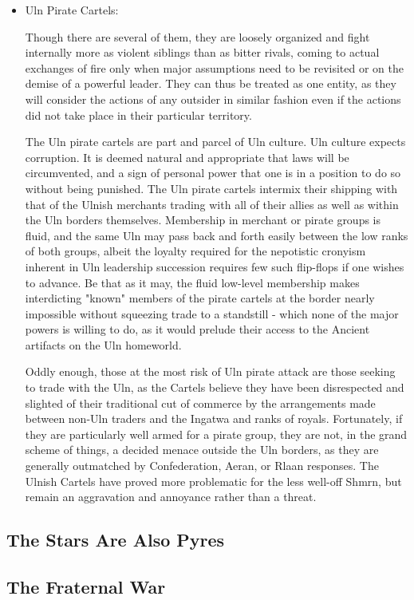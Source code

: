 \begin{itemize}
\item Uln Pirate Cartels:

Though there are several of them, they are loosely organized and fight
internally more as violent siblings than as bitter rivals, coming to
actual exchanges of fire only when major assumptions need to be
revisited or on the demise of a powerful leader. They can thus be
treated as one entity, as they will consider the actions of any
outsider in similar fashion even if the actions did not take place in
their particular territory.

The Uln pirate cartels are part and parcel of Uln culture. Uln culture
expects corruption. It is deemed natural and appropriate that laws
will be circumvented, and a sign of personal power that one is in a
position to do so without being punished. The Uln pirate cartels
intermix their shipping with that of the Ulnish merchants trading with
all of their allies as well as within the Uln borders
themselves. Membership in merchant or pirate groups is fluid, and the
same Uln may pass back and forth easily between the low ranks of both
groups, albeit the loyalty required for the nepotistic cronyism
inherent in Uln leadership succession requires few such flip-flops if
one wishes to advance. Be that as it may, the fluid low-level
membership makes interdicting "known" members of the pirate cartels at
the border nearly impossible without squeezing trade to a standstill -
which none of the major powers is willing to do, as it would prelude
their access to the Ancient artifacts on the Uln homeworld.

Oddly enough, those at the most risk of Uln pirate attack are those
seeking to trade with the Uln, as the Cartels believe they have been
disrespected and slighted of their traditional cut of commerce by the
arrangements made between non-Uln traders and the Ingatwa and ranks of
royals. Fortunately, if they are particularly well armed for a pirate
group, they are not, in the grand scheme of things, a decided menace
outside the Uln borders, as they are generally outmatched by
Confederation, Aeran, or Rlaan responses. The Ulnish Cartels have
proved more problematic for the less well-off Shmrn, but remain an
aggravation and annoyance rather than a threat.
\end{itemize}
\subsection{The Stars Are Also Pyres}
\subsection{The Fraternal War}
